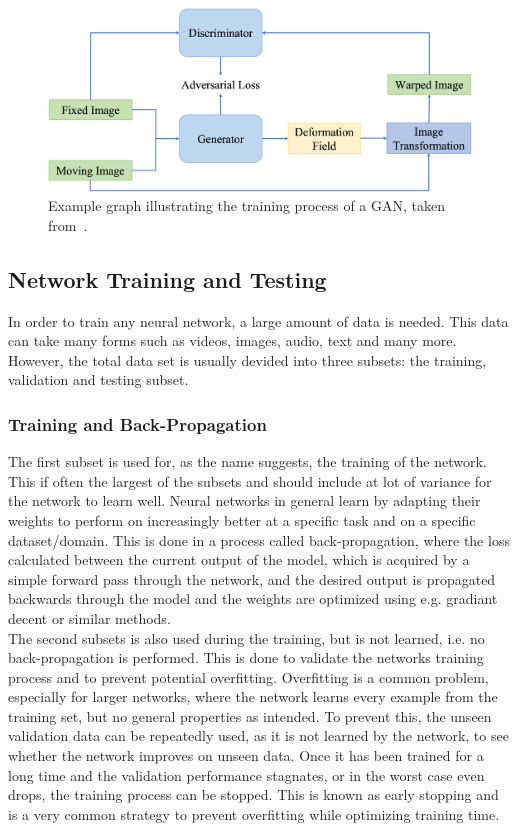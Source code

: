 \begin{figure}[h] %
	\centering
	\graphicspath{{images/}{\main/images/}}
	\includegraphics[width=\linewidth]{GANRegistrationGraph.jpg} 
	\caption{Example graph illustrating the training process of a GAN, taken from~\cite{Zou2022}.}
	\label{fig:GANRegistration}
\end{figure}

\subsection{Network Training and Testing} \label{SubSec:NetworkTrainingAndTesting}
In order to train any neural network, a large amount of data is needed. This data can take many forms such as videos, images, audio, text and many more. However, the total data set is usually devided into three subsets: the training, validation and testing subset. 

\subsubsection{Training and Back-Propagation}
The first subset is used for, as the name suggests, the training of the network. This if often the largest of the subsets and should include at lot of variance for the network to learn well. Neural networks in general learn by adapting their weights to perform on increasingly better at a specific task and on a specific dataset/domain. This is done in a process called back-propagation, where the loss calculated between the current output of the model, which is acquired by a simple forward pass through the network, and the desired output is propagated backwards through the model and the weights are optimized using e.g. gradiant decent or similar methods. \\
The second subsets is also used during the training, but is not learned, i.e. no back-propagation is performed. This is done to validate the networks training process and to prevent potential overfitting. Overfitting is a common problem, especially for larger networks, where the network learns every example from the training set, but no general properties as intended. To prevent this, the unseen validation data can be repeatedly used, as it is not learned by the network, to see whether the network improves on unseen data. Once it has been trained for a long time and the validation performance stagnates, or in the worst case even drops, the training process can be stopped. This is known as early stopping and is a very common strategy to prevent overfitting while optimizing training time.\\

